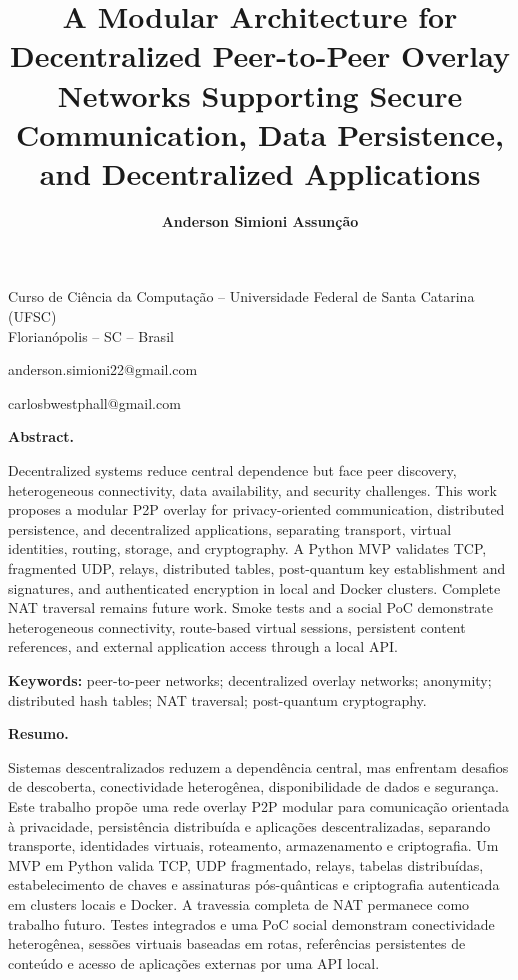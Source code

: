 \documentclass[12pt,a4paper]{article}
\title{\bfseries\fontsize{16}{18}\selectfont
A Modular Architecture for Decentralized Peer-to-Peer Overlay Networks Supporting Secure Communication, Data Persistence, and Decentralized Applications
}
\author{\textbf{Anderson Simioni Assunção}}
\date{}
\newcommand{\email}[1]{%
  {\centering\fontfamily{pcr}\fontsize{10}{12}\selectfont #1\par}
}
\newenvironment{resumopt}{%
  \begin{list}{}{
      \setlength{\leftmargin}{0.8cm}
      \setlength{\rightmargin}{0.8cm}}
  \item[]\noindent\textbf{Resumo.}
}{\end{list}}
\newenvironment{abstracten}{%
  \begin{list}{}{
      \setlength{\leftmargin}{0.8cm}
      \setlength{\rightmargin}{0.8cm}}
  \item[]\noindent\textbf{Abstract.}
}{\end{list}}
\begin{document}
\maketitle
\thispagestyle{empty}
\vspace{-6pt}

{\centering
Curso de Ciência da Computação -- Universidade Federal de Santa Catarina (UFSC)\\
Florianópolis -- SC -- Brasil
\par}

\vspace{6pt}
\email{anderson.simioni22@gmail.com}
\email{carlosbwestphall@gmail.com}

\vspace{12pt}

\begin{abstracten}
Decentralized systems reduce central dependence but face peer discovery, heterogeneous connectivity, data availability, and security challenges. This work proposes a modular P2P overlay for privacy-oriented communication, distributed persistence, and decentralized applications, separating transport, virtual identities, routing, storage, and cryptography. A Python MVP validates TCP, fragmented UDP, relays, distributed tables, post-quantum key establishment and signatures, and authenticated encryption in local and Docker clusters. Complete NAT traversal remains future work. Smoke tests and a social PoC demonstrate heterogeneous connectivity, route-based virtual sessions, persistent content references, and external application access through a local API.
\end{abstracten}

\noindent\textbf{Keywords:} peer-to-peer networks; decentralized overlay networks; anonymity; distributed hash tables; NAT traversal; post-quantum cryptography.

\begin{resumopt}
Sistemas descentralizados reduzem a dependência central, mas enfrentam desafios de descoberta, conectividade heterogênea, disponibilidade de dados e segurança. Este trabalho propõe uma rede overlay P2P modular para comunicação orientada à privacidade, persistência distribuída e aplicações descentralizadas, separando transporte, identidades virtuais, roteamento, armazenamento e criptografia. Um MVP em Python valida TCP, UDP fragmentado, relays, tabelas distribuídas, estabelecimento de chaves e assinaturas pós-quânticas e criptografia autenticada em clusters locais e Docker. A travessia completa de NAT permanece como trabalho futuro. Testes integrados e uma PoC social demonstram conectividade heterogênea, sessões virtuais baseadas em rotas, referências persistentes de conteúdo e acesso de aplicações externas por uma API local.
\end{resumopt}
\end{document}
